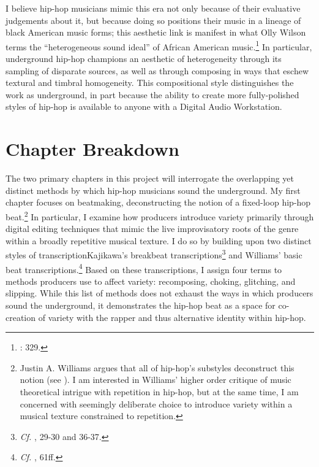 I believe hip-hop musicians mimic this era not only because of their evaluative judgements about it, but because doing so positions their music in a lineage of black American music forms; this aesthetic link is manifest in what Olly Wilson terms the ``heterogeneous sound ideal'' of African American music.\footnote{\cite{ollywilsonHeterogeneousSoundIdeal1992}: 329.} In particular, underground hip-hop champions an aesthetic of heterogeneity through its sampling of disparate sources, as well as  through composing in ways that eschew textural and timbral homogeneity. This compositional style distinguishes the work as underground, in part because the ability to create more fully-polished styles of hip-hop is available to anyone with a Digital Audio Workstation. 

\section{Chapter Breakdown}
The two primary chapters in this project will interrogate the overlapping yet distinct methods by which hip-hop musicians sound the underground. My first chapter focuses on beatmaking, deconstructing the notion of a fixed-loop hip-hop beat.\footnote{Justin A. Williams argues that all of hip-hop's substyles deconstruct this notion (see \cite{justinawilliamsBeatsFlowsResponse2009}). I am interested in Williams' higher order critique of music theoretical intrigue with repetition in hip-hop, but at the same time, I am concerned with seemingly deliberate choice to introduce variety within a musical texture constrained to repetition.} In particular, I examine how producers introduce variety primarily through digital editing techniques that mimic the live improvisatory roots of the genre within a broadly repetitive musical texture. I do so by building upon two distinct styles of transcription\textemdash Kajikawa's breakbeat  transcriptions\footnote{\textit{Cf.} \cite{lorenkajikawaSoundingRaceRap2015}, 29-30 and 36-37.} and Williams' basic beat transcriptions.\footnote{\textit{Cf.} \cite{justinawilliamsRhyminStealinMusical2013}, 61ff.} Based on these transcriptions, I assign four terms to methods producers use to affect variety: recomposing, choking, glitching, and slipping. While this list of methods does not exhaust the ways in which producers sound the underground, it demonstrates the hip-hop beat as a space for co-creation of variety with the rapper and thus alternative identity within hip-hop.

